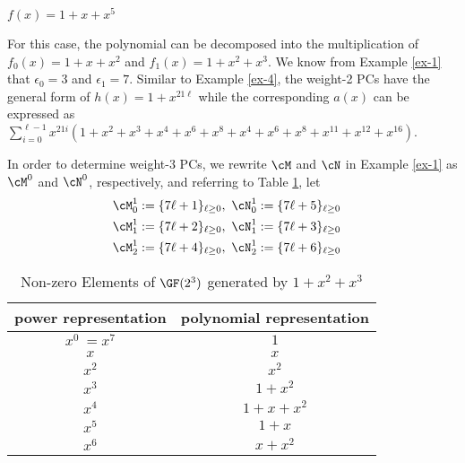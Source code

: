 \begin{example}
$f(x)=1+x+x^5$

For this case, the polynomial can be decomposed into the multiplication of $f_0(x)=1+x+x^2$ and $f_1(x)=1+x^2+x^3$.  We know from Example \ref{ex-1} that $\epsilon_0=3$ and $\epsilon_1=7$. Similar to Example \ref{ex-4}, the weight-2 PCs have the general  form of $h(x)=1+x^{21\ell}$ while the corresponding $a(x)$ can be expressed as $\sum_{i=0}^{\ell-1} x^{21i}(1+x^2+x^3+x^4+x^6+x^8+x^{4}+x^{6}+x^{8}+x^{11}+x^{12}+x^{16})$.


In order to determine weight-3 PCs, we rewrite $\cM$ and $\cN$ in Example \ref{ex-1} as $\cM^0$ and $\cN^0$, respectively,
and referring to Table \ref{novelTabWt3-5}, let
\begin{align}
	\cM_0^1 &:= \{7\ell + 1\}_{\ell \geq 0},~\cN_0^1 := \{7\ell + 5\}_{\ell \geq 0}\cr
	\cM_1^1 &:= \{7\ell + 2\}_{\ell \geq 0},~\cN_1^1 := \{7\ell + 3\}_{\ell \geq 0}\cr
	\cM_2^1 &:= \{7\ell + 4\}_{\ell \geq 0},~\cN_2^1 := \{7\ell + 6\}_{\ell \geq 0}
\end{align}
\begin{table}[htbp]
\caption{Non-zero Elements of $\GF (2^3)$ generated by $1+x^2+x^3$}
\centering
\begin{tabular}{c c} 
\toprule
power representation & polynomial representation \\ [0.5ex] 
\midrule
$x^0~=x^7$ & $1$\\
\hline
$x$ & $x$\\
\hline
$x^2$ &  $x^2$\\
\hline
$x^3$ &  $1+x^2$\\
\hline
$x^4$ &  $1+x+x^2$\\
\hline
$x^5$ &  $1+x$\\
\hline
$x^6$ &  $x+x^2$\\
\bottomrule
\end{tabular}
\label{novelTabWt3-5}
\end{table}



\end{example}
